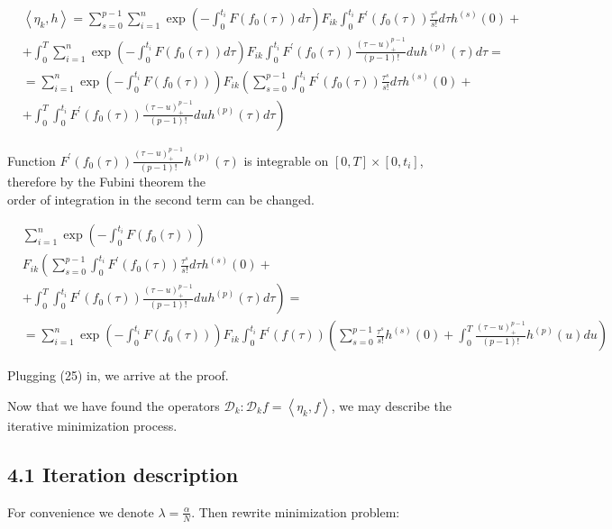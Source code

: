 \documentclass[10pt]{article}
\begin{document}
\begin{align*}
&\left\langle\eta_{k}, h\right\rangle= \sum_{s=0}^{p-1} \sum_{i=1}^{n} \exp \left(-\int_{0}^{t_{i}} F\left(f_{0}(\tau)\right) d \tau\right) F_{i k} \int_{0}^{t_{i}} F^{\prime}\left(f_{0}(\tau)\right) \frac{\tau^{s}}{s!} d \tau h^{(s)}(0)+ \\
&+\int_{0}^{T} \sum_{i=1}^{n} \exp \left(-\int_{0}^{t_{i}} F\left(f_{0}(\tau)\right) d \tau\right) F_{i k} \int_{0}^{t_{i}} F^{\prime}\left(f_{0}(\tau)\right) \frac{(\tau-u)_{+}^{p-1}}{(p-1)!} d u h^{(p)}(\tau) d \tau= \\
&=\sum_{i=1}^{n} \exp \left(-\int_{0}^{t_{i}} F\left(f_{0}(\tau)\right)\right) F_{i k}\left(\sum_{s=0}^{p-1} \int_{0}^{t_{i}} F^{\prime}\left(f_{0}(\tau)\right) \frac{\tau^{s}}{s!} d \tau h^{(s)}(0)+\right. \\
&\left.+\int_{0}^{T} \int_{0}^{t_{i}} F^{\prime}\left(f_{0}(\tau)\right) \frac{(\tau-u)_{+}^{p-1}}{(p-1)!} d u h^{(p)}(\tau) d \tau\right) \tag{26}
\end{align*}


Function $F^{\prime}\left(f_{0}(\tau)\right) \frac{(\tau-u)_{+}^{p-1}}{(p-1)!} h^{(p)}(\tau)$ is integrable on $[0, T] \times\left[0, t_{i}\right]$, therefore by the Fubini theorem the\\
order of integration in the second term can be changed.


\begin{align*}
& \sum_{i=1}^{n} \exp \left(-\int_{0}^{t_{i}} F\left(f_{0}(\tau)\right)\right) \\
& F_{i k}\left(\sum_{s=0}^{p-1} \int_{0}^{t_{i}} F^{\prime}\left(f_{0}(\tau)\right) \frac{\tau^{s}}{s!} d \tau h^{(s)}(0)+\right. \\
& \left.+\int_{0}^{T} \int_{0}^{t_{i}} F^{\prime}\left(f_{0}(\tau)\right) \frac{(\tau-u)_{+}^{p-1}}{(p-1)!} d u h^{(p)}(\tau) d \tau\right)=  \tag{27}\\
& =\sum_{i=1}^{n} \exp \left(-\int_{0}^{t_{i}} F\left(f_{0}(\tau)\right)\right) F_{i k} \int_{0}^{t_{i}} F^{\prime}(f(\tau))\left(\sum_{s=0}^{p-1} \frac{\tau^{s}}{s!} h^{(s)}(0)+\int_{0}^{T} \frac{(\tau-u)_{+}^{p-1}}{(p-1)!} h^{(p)}(u) d u\right)
\end{align*}


Plugging (25) in, we arrive at the proof.

Now that we have found the operators $\mathcal{D}_{k}: \mathcal{D}_{k} f=\left\langle\eta_{k}, f\right\rangle$, we may describe the iterative minimization process.

\subsection*{4.1 Iteration description}
For convenience we denote $\lambda=\frac{\alpha}{N}$. Then rewrite minimization problem:
\end{document}
